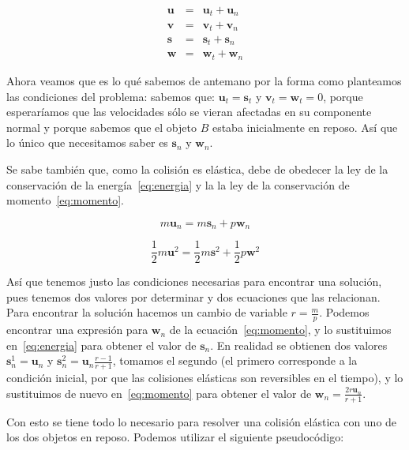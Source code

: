 \begin{eqnarray}
 \textbf{u} & = & \textbf{u}_t + \textbf{u}_n \nonumber \\
 \textbf{v} & = & \textbf{v}_t + \textbf{v}_n \nonumber \\
 \textbf{s} & = & \textbf{s}_t + \textbf{s}_n \nonumber \\
 \textbf{w} & = & \textbf{w}_t + \textbf{w}_n \nonumber
\end{eqnarray}

Ahora veamos que es lo qué sabemos de antemano por la forma como planteamos las condiciones del problema: sabemos que: $\textbf{u}_t = \textbf{s}_t$ y $\textbf{v}_t = \textbf{w}_t = 0$, porque esperaríamos que las velocidades sólo se vieran afectadas en su componente normal y porque sabemos que el objeto $B$ estaba inicialmente en reposo.
Así que lo único que necesitamos saber es $\textbf{s}_n$ y $\textbf{w}_n$.

Se sabe también que, como la colisión es elástica, debe de obedecer la ley de la conservación de la energía~\eqref{eq:energia} y la la ley de la conservación de momento~\eqref{eq:momento}.

\begin{equation}
m \textbf{u}_n = m \textbf{s}_n + p \textbf{w}_n
\label{eq:momento}
\end{equation}

\begin{equation}
\frac{1}{2} m \textbf{u}^2 = \frac{1}{2} m \textbf{s}^2 + \frac{1}{2} p \textbf{w}^2
\label{eq:energia}
\end{equation}

Así que tenemos justo las condiciones necesarias para encontrar una solución, pues tenemos dos valores por determinar y dos ecuaciones que las relacionan.
Para encontrar la solución hacemos un cambio de variable $r = \frac{m}{p}$.
Podemos encontrar una expresión para $\textbf{w}_n$ de la ecuación~\eqref{eq:momento}, y lo sustituimos en~\eqref{eq:energia} para obtener el valor de $\textbf{s}_n$. En realidad se obtienen dos valores $\textbf{s}_{n}^{1} = \textbf{u}_n$ y $\textbf{s}_{n}^{2} = \textbf{u}_n \frac{r-1}{r+1}$, tomamos el segundo (el primero corresponde a la condición inicial, por que las colisiones elásticas son reversibles en el tiempo), y lo sustituimos de nuevo en~\eqref{eq:momento} para obtener el valor de $\textbf{w}_n = \frac{2 r \textbf{u}_n}{r + 1}$.

Con esto se tiene todo lo necesario  para resolver una colisión elástica con uno de los dos objetos en reposo. Podemos utilizar el siguiente pseudocódigo:

